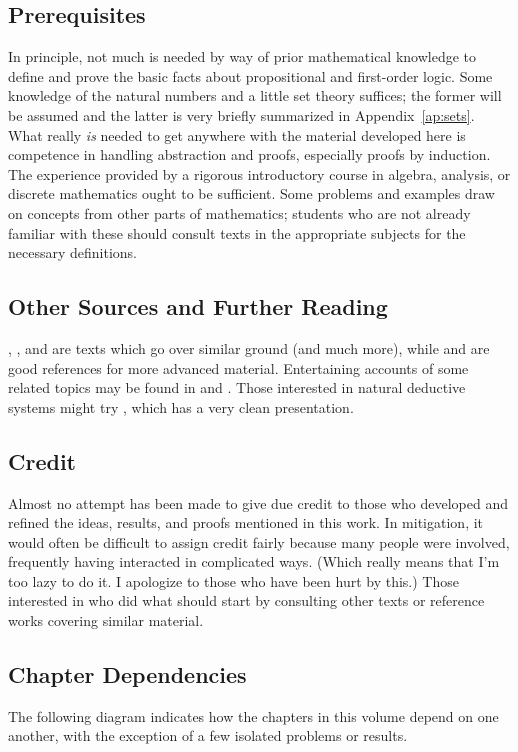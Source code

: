 \documentclass[12pt]{amsbook}
\theoremstyle{plain}
\theoremstyle{definition}
\theoremstyle{remark}
\begin{document}
\subsection*{Prerequisites}
In principle,  not much is needed by way of prior mathematical knowledge to define and prove the basic facts about propositional and first-order logic.  Some knowledge of the natural numbers and a little set theory suffices;  the former will be assumed and the latter is very briefly summarized in Appendix~\ref{ap:sets}.  What really {\em is\/} needed to get anywhere with the material developed here is competence in handling abstraction and proofs,  especially proofs by induction.  The experience provided by a rigorous introductory course in algebra,  analysis,  or discrete mathematics ought to be sufficient.  Some problems and examples draw on concepts from other parts of mathematics;  students who are not already familiar with these should consult texts in the appropriate subjects for the necessary definitions.  

\subsection*{Other Sources and Further Reading}
\cite{HE:MIL},  \cite{JM:IML},  and \cite{YM:CML} are texts which go over similar ground (and much more),  while \cite{JB:HML} and \cite{CK:MT} are good references for more advanced material.  Entertaining accounts of some related topics may be found in \cite{DH:GEB} and \cite{RP:ENM}.  Those interested in natural deductive systems might try \cite{MB:LB},  which has a very clean presentation.

\subsection*{Credit}
Almost no attempt has been made to give due credit to those who developed and refined the ideas,  results,  and proofs mentioned in this work.  In mitigation,  it would often be difficult to assign credit fairly because many people were involved,  frequently having interacted in complicated ways.  (Which really means that I'm too lazy to do it.  I apologize to those who have been hurt by this.)  Those interested in who did what should start by consulting other texts or reference works covering similar material. 

\subsection*{Chapter Dependencies}
The following diagram indicates how the chapters in this volume depend on one another,  with the exception of a few isolated problems or results.
\end{document}
